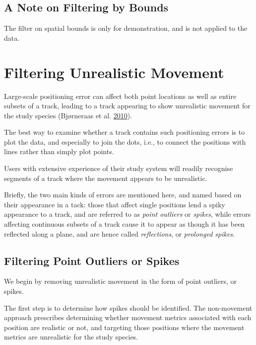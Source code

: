 \documentclass[
]{scrreprt}
\begin{document}
\hypertarget{a-note-on-filtering-by-bounds}{%
\subsection{A Note on Filtering by Bounds}\label{a-note-on-filtering-by-bounds}}

The filter on spatial bounds is only for demonstration, and is not applied to the data.

\hypertarget{filtering-unrealistic-movement}{%
\section{Filtering Unrealistic Movement}\label{filtering-unrealistic-movement}}

Large-scale positioning error can affect both point locations as well as entire subsets of a track, leading to a track appearing to show unrealistic movement for the study species (Bjørneraas et al. \protect\hyperlink{ref-bjorneraas2010}{2010}).

The best way to examine whether a track contains such positioning errors is to plot the data, and especially to join the dots, i.e., to connect the positions with lines rather than simply plot points.

Users with extensive experience of their study system will readily recognise segments of a track where the movement appears to be unrealistic.

Briefly, the two main kinds of errors are mentioned here, and named based on their appearance in a tack: those that affect single positions lend a spiky appearance to a track, and are referred to as \emph{point outliers} or \emph{spikes}, while errors affecting continuous subsets of a track cause it to appear as though it has been reflected along a plane, and are hence called \emph{reflections}, or \emph{prolonged spikes}.

\hypertarget{filtering-point-outliers-or-spikes}{%
\subsection{Filtering Point Outliers or Spikes}\label{filtering-point-outliers-or-spikes}}

We begin by removing unrealistic movement in the form of point outliers, or spikes.

The first step is to determine how spikes should be identified. The non-movement approach prescribes determining whether movement metrics associated with each position are realistic or not, and targeting those positions where the movement metrics are unrealistic for the study species.
\end{document}
